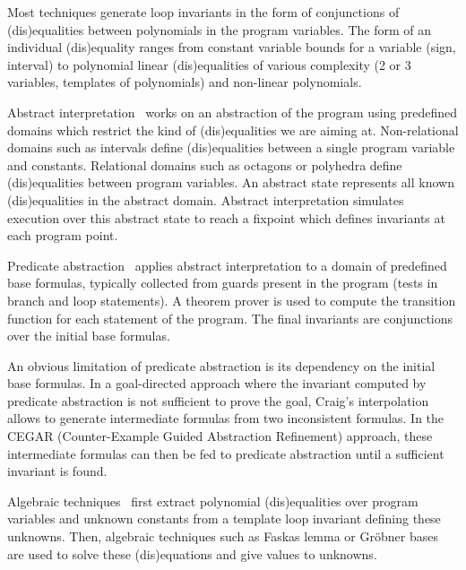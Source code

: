 \documentclass[a4paper,10pt]{article}
\begin{document}
Most techniques generate loop invariants in the form of conjunctions of
(dis)equalities between polynomials in the program variables. The form of an
individual (dis)equality ranges from constant variable bounds for a variable
(sign, interval) to polynomial linear (dis)equalities of various complexity (2
or 3 variables, templates of polynomials) and non-linear polynomials.

Abstract interpretation~\cite{cousot:1978:popl, mine:2006:hosc} works on an
abstraction of the program using predefined domains which restrict the kind of
(dis)equalities we are aiming at. Non-relational domains such as intervals
define (dis)equalities between a single program variable and
constants. Relational domains such as octagons or polyhedra define
(dis)equalities between program variables. An abstract state represents all
known (dis)equalities in the abstract domain. Abstract interpretation simulates
execution over this abstract state to reach a fixpoint which defines invariants
at each program point.

Predicate abstraction~\cite{graf:1997:cav} applies abstract interpretation to a
domain of predefined base formulas, typically collected from guards present in
the program (tests in branch and loop statements). A theorem prover is used to
compute the transition function for each statement of the program. The final
invariants are conjunctions over the initial base formulas.

An obvious limitation of predicate abstraction is its dependency on the initial
base formulas. In a goal-directed approach where the invariant computed by
predicate abstraction is not sufficient to prove the goal, Craig's
interpolation~\cite{mcmillan:2003:cav, mcmillan:2006:cav} allows to generate
intermediate formulas from two inconsistent formulas. In the CEGAR
(Counter-Example Guided Abstraction Refinement) approach, these intermediate
formulas can then be fed to predicate abstraction until a sufficient invariant
is found.

Algebraic techniques~\cite{colon:2003:cav, sankaranarayanan:2004:popl,
  kovacs:2008:csr} first extract polynomial (dis)equalities over program
variables and unknown constants from a template loop invariant defining these
unknowns. Then, algebraic techniques such as Faskas lemma or Gröbner bases are
used to solve these (dis)equations and give values to unknowns.

\end{document}
